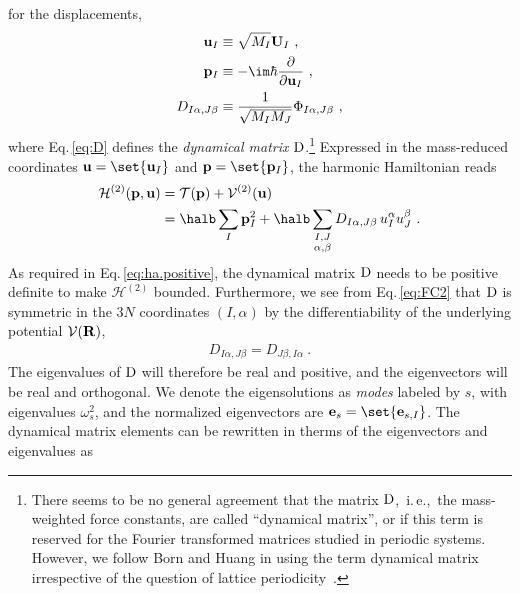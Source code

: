  for the displacements,
\begin{align}
	{\bf u}_I 
		&\equiv \sqrt{M_I} {\bf U}_I~, 
		\label{eq:uI} \\
	{\bf p}_I 
		&\equiv -\im \hbar \frac{\partial}{\partial {\bf u}_I}~,
		\label{eq:pI} \\
	D_{I \alpha, J \beta}
		&\equiv \frac{1}{\sqrt{M_I M_J}} 
		\Phi_{I \alpha, J \beta}~,
		\label{eq:D}
\end{align}
where Eq.\,\eqref{eq:D} defines the \emph{dynamical matrix} $\rm D$.\footnote{There seems to be no general agreement that the matrix $\rm D$,~i.\,e.,~the mass-weighted force constants, are called ``dynamical matrix'', or if this term is reserved for the Fourier transformed matrices studied in periodic systems. However, we follow Born and Huang in using the term dynamical matrix irrespective of the question of lattice periodicity~\cite[p.\,173]{BornHuang}.}
Expressed in the mass-reduced coordinates ${\bf u} = \set{{\bf u}_I}$ and ${\bf p} = \set{{\bf p}_I}$, the harmonic Hamiltonian reads
\begin{align}
	\begin{split}
		\mathcal{H}^{(2)}({\bf p}, {\bf u})
			&= \mathcal T ({\bf p}) + \mathcal{V}^{(2)} ({\bf u})\\
			&= \halb \sum_I {\bf p}_I^2 + 
				\halb \sum_{\substack{I, J \\ \alpha, \beta}}
					D_{I \alpha, J \beta}
					\, u_I^\alpha u_J^\beta~.
	\end{split}
	\label{eq:ha.H1}
\end{align}
%
As required in Eq.\,\eqref{eq:ha.positive}, the dynamical matrix $\rm D$ needs to be positive definite to make $\mathcal H^{(2)}$ bounded. Furthermore, we see from Eq.\,\eqref{eq:FC2} that $\rm D$ is symmetric in the $3N$ coordinates $(I, \alpha)$ by the differentiability of the underlying potential $\mathcal V ({\bf R})$,
\begin{align}
	D_{I \alpha, J \beta} = D_{J \beta, I \alpha}~.
	\label{eq:D.symmetric}
\end{align}
The eigenvalues of $\rm D$ will therefore be real and positive, and the eigenvectors will be real and orthogonal. We denote the eigensolutions as \emph{modes} labeled by $s$, with eigenvalues $\omega_s^2$, and the normalized eigenvectors are ${\bf e}_s = \set{{\bf e}_{s, I}}$. The dynamical matrix elements can be rewritten in therms of the eigenvectors and eigenvalues as
